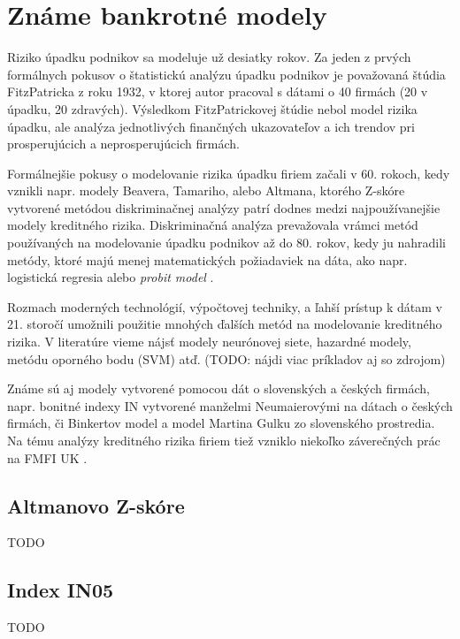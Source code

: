 \section{Známe bankrotné modely}

Riziko úpadku podnikov sa modeluje už desiatky rokov.
Za jeden z prvých formálnych pokusov o štatistickú analýzu úpadku podnikov je považovaná štúdia FitzPatricka z roku 1932,
v ktorej autor pracoval s dátami o 40 firmách (20 v úpadku, 20 zdravých).
Výsledkom FitzPatrickovej štúdie nebol model rizika úpadku, ale analýza jednotlivých finančných ukazovateľov a ich trendov pri prosperujúcich a neprosperujúcich firmách.

Formálnejšie pokusy o modelovanie rizika úpadku firiem začali v 60. rokoch, kedy vznikli napr. modely Beavera, Tamariho, alebo Altmana,
ktorého Z-skóre vytvorené metódou diskriminačnej analýzy patrí dodnes medzi najpoužívanejšie modely kreditného rizika.
Diskriminačná analýza prevažovala vrámci metód používaných na modelovanie úpadku podnikov až do 80. rokov, kedy ju nahradili metódy,
ktoré majú menej matematických požiadaviek na dáta, ako napr. logistická regresia alebo \emph{probit model} \cite{gruszczynski}.

Rozmach moderných technológií, výpočtovej techniky, a ľahší prístup k dátam v 21. storočí umožnili použitie mnohých ďalších metód na modelovanie kreditného rizika.
V literatúre vieme nájsť modely neurónovej siete, hazardné modely, metódu oporného bodu (SVM) atď. (TODO: nájdi viac príkladov aj so zdrojom)

Známe sú aj modely vytvorené pomocou dát o slovenských a českých firmách, napr. bonitné indexy IN vytvorené manželmi Neumaierovými na dátach o českých firmách,
či Binkertov model a model Martina Gulku zo slovenského prostredia. Na tému analýzy kreditného rizika firiem tiež vzniklo niekoľko záverečných prác na FMFI UK \cite{ondrusekova, bohdal}.

\subsection{Altmanovo Z-skóre}

TODO

\subsection{Index IN05}

TODO